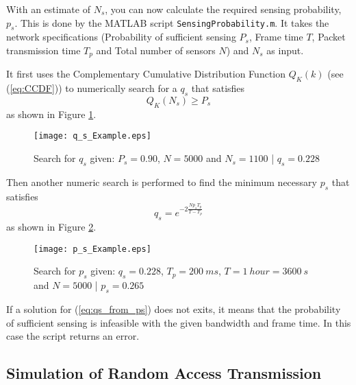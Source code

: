 \documentclass[Main]{subfiles}
\begin{document}
		With an estimate of $N_s$, you can now calculate the required sensing probability, $p_s$.
		This is done by the MATLAB script \texttt{SensingProbability.m}.
		It takes the network specifications (Probability of sufficient sensing $P_s$, Frame time $T$, Packet transmission time $T_p$ and Total number of sensors $N$) and $N_s$ as input.

		It first uses the Complementary Cumulative Distribution Function $Q_K(k)$ (see (\ref{eq:CCDF})) to numerically search for a $q_s$ that satisfies 
		\begin{equation}
			Q_K(N_s) \geq P_s
		\end{equation}
		as shown in Figure \ref{fig:q_s_Example}.

		\begin{figure}[H]
			\centering 
			\texttt{[image: q\_s\_Example.eps]}
			\caption{
				Search for $q_s$ given: 
				$P_s = 0.90$, 
				$N = 5000$ and
				$N_s = 1100$ | 
				$q_s = 0.228$
			}
			\label{fig:q_s_Example}
		\end{figure}

		Then another numeric search is performed to find the minimum necessary $p_s$ that satisfies
		\begin{equation}
			q_s =
				e^{
					-2\frac
						{Np_sT_p}
						{T-T_p}
					}
			\label{eq:qs_from_ps}
		\end{equation}
		as shown in Figure \ref{fig:p_s_Example}.

		\begin{figure}[H]
			\centering 
			\texttt{[image: p\_s\_Example.eps]}
			\caption{
				Search for $p_s$ given:
				$q_s = 0.228$, 
				$T_p = 200\ ms$, 
				$T = 1\ hour = 3600\ s$  and
				$N = 5000$ |
				$p_s = 0.265$ 
			}
			\label{fig:p_s_Example}
		\end{figure}

		If a solution for (\ref{eq:qs_from_ps}) does not exits, it means that the probability of sufficient sensing is infeasible with the given bandwidth and frame time.
		In this case the script returns an error.



	\subsection{Simulation of Random Access Transmission} %
	\label{sub:simulation_of_random_access_transmission}
\end{document}
